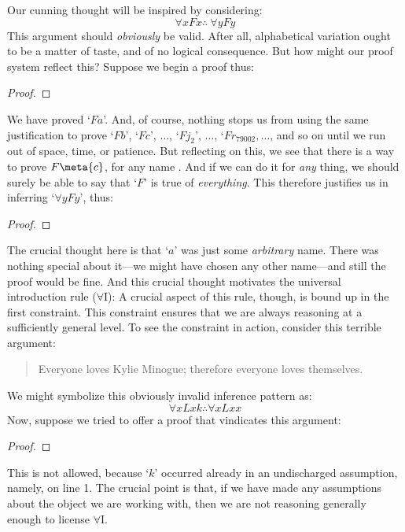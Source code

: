 Our cunning thought will be inspired by considering:
$$\forall x Fx \therefore\ \forall y Fy$$
This argument should \emph{obviously} be valid. After all, alphabetical variation ought to be a matter of taste, and of no logical consequence. But how might our proof system reflect this? Suppose we begin a proof thus:
\begin{proof}
	 
\end{proof}
We have proved `$Fa$'. And, of course, nothing stops us from using the same justification to prove `$Fb$', `$Fc$', $\ldots$, `$Fj_2$', $\ldots$, `$Fr_{79002}, \ldots$, and so on until we run out of space, time, or patience. But reflecting on this, we see that there is a way to prove $F\meta{c}$, for any name . And if we can do it for \emph{any} thing, we should surely be able to say that `$F$' is true of \emph{everything}. This therefore justifies us in inferring `$\forall y Fy$', thus:
\begin{proof}
	 
	 
\end{proof}
The crucial thought here is that `$a$' was just some \emph{arbitrary} name. There was nothing special about it---we might have chosen any other name---and still the proof would be fine. And this crucial thought motivates the universal introduction rule ($\forall$I):
A crucial aspect of this rule, though, is bound up in the first constraint. This constraint ensures that we are always reasoning at a sufficiently general level.
To see the constraint in action, consider this terrible argument:
	\begin{quote}
		Everyone loves Kylie Minogue; therefore everyone loves themselves.
	\end{quote}
We might symbolize this obviously invalid inference pattern as:
$$\forall x Lxk \therefore \forall x Lxx$$
Now, suppose we tried to offer a proof that vindicates this argument:
\begin{proof}
	 
	 
\end{proof}\noindent
This is not allowed, because `$k$' occurred already in an undischarged assumption, namely, on line 1. The crucial point is that, if we have made any assumptions about the object we are working with, then we are not reasoning generally enough to license $\forall$I.

